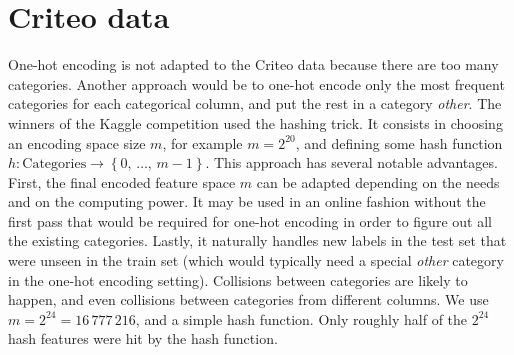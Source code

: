 \section{Criteo data}\label{sec:criteo_data}

One-hot encoding is not adapted to the Criteo data because there are too many categories.
Another approach would be to one-hot encode only the most frequent categories for each categorical column,
and put the rest in a category \textit{other}.
The winners of the Kaggle competition used the hashing trick.
It consists in choosing an encoding space size $m$,
for example $m = 2^{20}$,
and defining some hash function $h \colon \text{Categories} \to \left\{ 0,\, \dots,\, m - 1 \right\}$.
This approach has several notable advantages.
First, the final encoded feature space $m$ can be adapted depending on the needs and on the computing power.
It may be used in an online fashion without the first pass
that would be required for one-hot encoding in order to figure out all the existing categories.
Lastly, it naturally handles new labels in the test set that were unseen in the train set
(which would typically need a special \textit{other} category in the one-hot encoding setting).
Collisions between categories are likely to happen,
and even collisions between categories from different columns.
We use
$m = 2^{24} = 16\,777\,216$,
and a simple hash function.
Only roughly half of the $2^{24}$ hash features were hit by the hash function.
